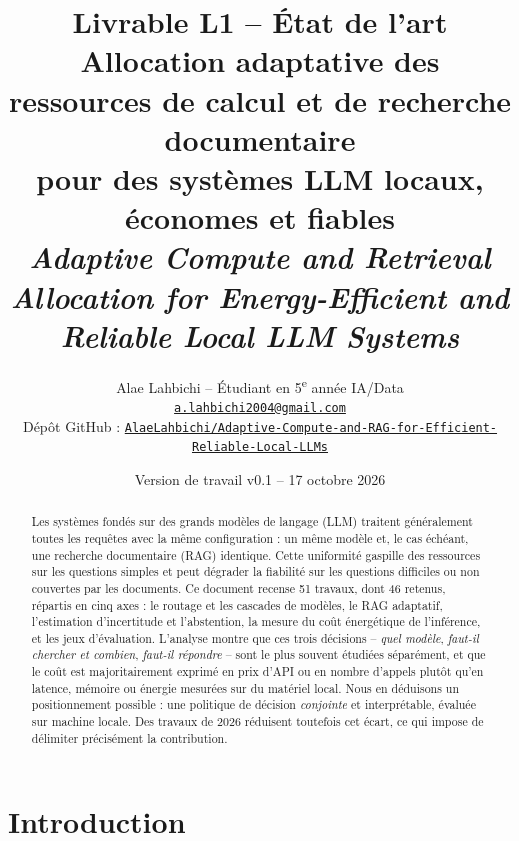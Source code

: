 \documentclass[11pt,a4paper]{article}
\title{\textbf{Livrable L1 -- État de l'art}\\[4pt]
\large Allocation adaptative des ressources de calcul et de recherche documentaire\\ pour des systèmes LLM locaux, économes et fiables\\[2pt]
\normalsize\textit{Adaptive Compute and Retrieval Allocation for Energy-Efficient and Reliable Local LLM Systems}}
\author{Alae Lahbichi -- Étudiant en 5\textsuperscript{e} année IA/Data\\[2pt]
\small\href{mailto:a.lahbichi2004@gmail.com}{\texttt{a.lahbichi2004@gmail.com}}\\
\small Dépôt GitHub : \href{https://github.com/AlaeLahbichi/Adaptive-Compute-and-RAG-for-Efficient-Reliable-Local-LLMs}{\footnotesize\texttt{AlaeLahbichi/Adaptive-Compute-and-RAG-for-Efficient-Reliable-Local-LLMs}}}
\date{Version de travail v0.1 -- 17 octobre 2026}
\begin{document}
\maketitle

\begin{center}
\end{center}

\begin{abstract}
\noindent Les systèmes fondés sur des grands modèles de langage (LLM) traitent généralement toutes les
requêtes avec la même configuration : un même modèle et, le cas échéant, une recherche documentaire (RAG)
identique. Cette uniformité gaspille des ressources sur les questions simples et peut dégrader la
fiabilité sur les questions difficiles ou non couvertes par les documents. Ce document recense
51 travaux, dont 46 retenus, répartis en cinq axes : le routage et les cascades de modèles, le RAG
adaptatif, l'estimation d'incertitude et l'abstention, la mesure du coût énergétique de l'inférence,
et les jeux d'évaluation. L'analyse montre que ces trois décisions -- \emph{quel modèle},
\emph{faut-il chercher et combien}, \emph{faut-il répondre} -- sont le plus souvent étudiées
séparément, et que le coût est majoritairement exprimé en prix d'API ou en nombre d'appels plutôt
qu'en latence, mémoire ou énergie mesurées sur du matériel local. Nous en déduisons un positionnement
possible : une politique de décision \emph{conjointe} et interprétable, évaluée sur machine locale.
Des travaux de 2026 réduisent toutefois cet écart, ce qui impose de délimiter précisément la
contribution.
\end{abstract}

\clearpage
\tableofcontents
\clearpage

\section{Introduction}
\end{document}
